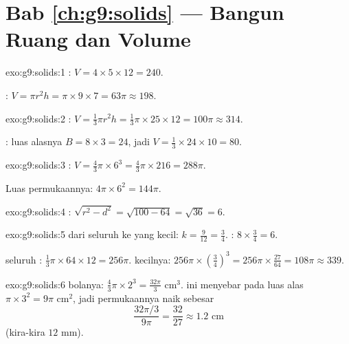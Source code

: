 \section*{Bab \ref{ch:g9:solids} --- Bangun Ruang dan Volume}

\begin{solution}{exo:g9:solids:1}
: $V = 4 \times 5 \times 12 = 240$.

: $V = \pi r^2 h = \pi \times 9 \times 7 = 63\pi \approx 198$.
\end{solution}

\begin{solution}{exo:g9:solids:2}
: $V = \frac13 \pi r^2 h = \frac13 \pi \times 25 \times 12 =
100\pi \approx 314$.

: luas alasnya $B = 8 \times 3 = 24$, jadi
$V = \frac13 \times 24 \times 10 = 80$.
\end{solution}

\begin{solution}{exo:g9:solids:3}
: $V = \frac43 \pi \times 6^3 = \frac43 \pi \times 216 = 288\pi$.

Luas permukaannya: $4\pi \times 6^2 = 144\pi$.
\end{solution}

\begin{solution}{exo:g9:solids:4}
 : $\sqrt{r^2 - d^2} = \sqrt{100 - 64} =
\sqrt{36} = 6$.
\end{solution}

\begin{solution}{exo:g9:solids:5}
 dari seluruh  ke yang kecil:
$k = \frac{9}{12} = \frac34$.  :
$8 \times \frac34 = 6$.

 seluruh : $\frac13\pi \times 64 \times 12 = 256\pi$.
  kecilnya: $256\pi \times \left(\frac34\right)^3 =
256\pi \times \frac{27}{64} = 108\pi \approx 339$.
\end{solution}

\begin{solution}{exo:g9:solids:6}
 bolanya: $\frac43\pi \times 2^3 = \frac{32\pi}{3}$ cm$^3$.
 ini menyebar pada luas alas $\pi \times 3^2 = 9\pi$ cm$^2$,
jadi permukaannya naik sebesar
\[
\frac{32\pi/3}{9\pi} = \frac{32}{27} \approx 1.2 \text{ cm}
\]
(kira-kira $12$ mm).
\end{solution}

